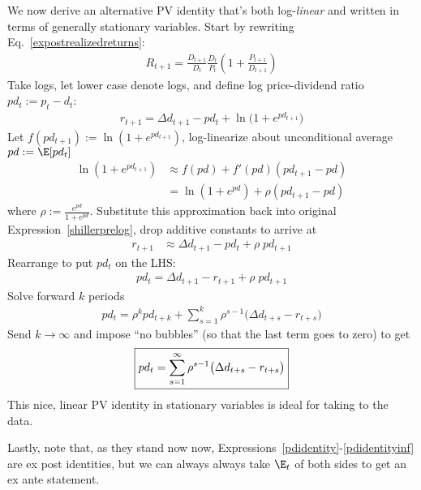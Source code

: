 \documentclass[12pt]{article}
\theoremstyle{plain}
\theoremstyle{definition}
\theoremstyle{remark}
\newcommand{\ra}{\rightarrow}
\begin{document}
\begin{multicols*}{2}
We now derive an alternative PV identity that's both log-\emph{linear}
and written in terms of generally stationary variables.
Start by rewriting Eq.~\ref{expostrealizedreturns}:
\begin{align*}
  R_{t+1}
  =
  \frac{D_{t+1}}{D_t}
  \frac{D_{t}}{P_t}
  \left(
  1+
  \frac{P_{t+1}}{D_{t+1}}
  \right)
\end{align*}
Take logs, let lower case denote logs, and define log price-dividend
ratio $pd_t:=p_t-d_t$:
\begin{align}
  r_{t+1}
  =
  \Delta d_{t+1} - pd_t + \ln\big( 1+ e^{pd_{t+1}} \big)
  \label{shillerprelog}
\end{align}
Let $f(pd_{t+1}):=\ln(1+e^{pd_{t+1}})$, log-linearize
about unconditional average $pd:=\E[pd_t]$
\begin{align*}
  \ln(1+e^{pd_{t+1}})
  &\approx
  f(pd) + f'(pd)(pd_{t+1}-pd)
  \\
  &=
  \ln(1+e^{pd})
  +
  \rho
  (pd_{t+1}-pd)
\end{align*}
where $\rho:=\frac{e^{pd}}{1+e^{pd}}$.
Substitute this approximation back into original
Expression~\ref{shillerprelog}, drop additive constants to arrive at
\begin{align*}
  r_{t+1}
  &\approx \Delta d_{t+1} - pd_t + \rho \; pd_{t+1}
\end{align*}
Rearrange to put $pd_t$ on the LHS:
\begin{align}
  pd_t
  =
    \Delta d_{t+1}- r_{t+1} + \rho \; pd_{t+1}
  \label{pdidentity}
\end{align}
Solve forward $k$ periods
\begin{align}
  pd_t = \rho^kpd_{t+k}
  +\sum_{s=1}^k \rho^{s-1}\big(\Delta d_{t+s}-r_{t+s}\big)
  \label{pdidentityk}
\end{align}
Send $k\ra \infty$ and impose ``no bubbles'' (so that the last term goes
to zero) to get
\begin{align}
  \boxed{%
  pd_t
  =
  \sum_{s=1}^\infty
  \rho^{s-1}\big(\Delta d_{t+s}-r_{t+s}\big)
  }
  \label{pdidentityinf}
\end{align}
This nice, linear PV identity in stationary variables is ideal for
taking to the data.

Lastly, note that, as they stand now now,
Expressions~\ref{pdidentity}-\ref{pdidentityinf} are ex post identities,
but we can always always take $\E_t$ of both sides to get an ex ante
statement.



\end{multicols*}
\end{document}
